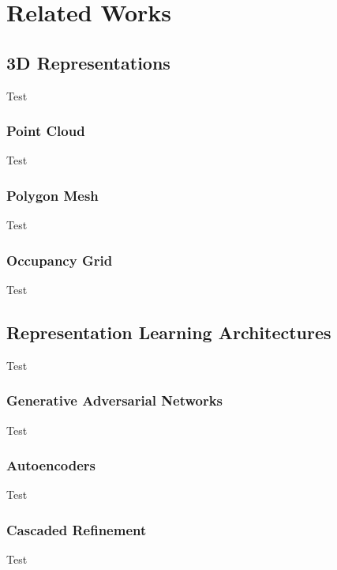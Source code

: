 \chapter{Related Works}

\vspace{1em}

\section{3D Representations}

Test

\subsection{Point Cloud}

Test

\subsection{Polygon Mesh}

Test

\subsection{Occupancy Grid}

Test


\section{Representation Learning Architectures}

Test

\subsection{Generative Adversarial Networks}

Test

\subsection{Autoencoders}

Test

\subsection{Cascaded Refinement}

Test
